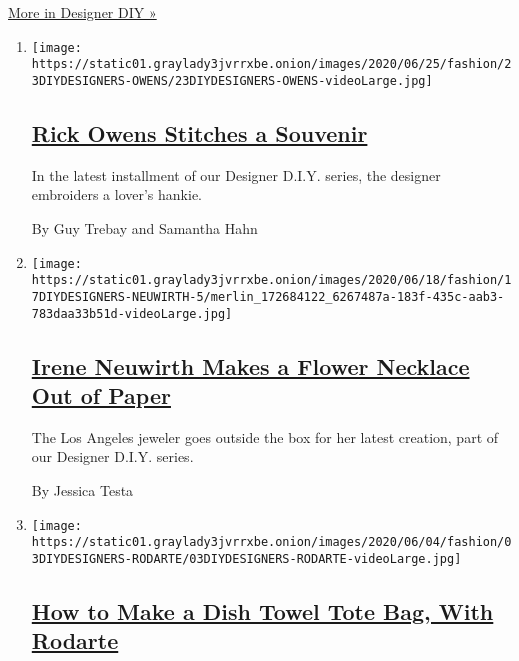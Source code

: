 \href{/issue/fashion/2020/06/19/designer-diy}{More in Designer DIY »}

\begin{enumerate}
\def\labelenumi{\arabic{enumi}.}
\item
  \texttt{[image: https://static01.graylady3jvrrxbe.onion/images/2020/06/25/fashion/23DIYDESIGNERS-OWENS/23DIYDESIGNERS-OWENS-videoLarge.jpg]}

  \hypertarget{rick-owens-stitches-a-souvenir}{%
  \subsection{\texorpdfstring{\href{/2020/06/23/style/DIY-sewing-rick-owens-stitches-a-souvenir.html}{Rick
  Owens Stitches a
  Souvenir}}{Rick Owens Stitches a Souvenir}}\label{rick-owens-stitches-a-souvenir}}

  In the latest installment of our Designer D.I.Y. series, the designer
  embroiders a lover's hankie.

  By Guy Trebay and Samantha Hahn
\item
  \texttt{[image: https://static01.graylady3jvrrxbe.onion/images/2020/06/18/fashion/17DIYDESIGNERS-NEUWIRTH-5/merlin\_172684122\_6267487a-183f-435c-aab3-783daa33b51d-videoLarge.jpg]}

  \hypertarget{irene-neuwirth-makes-a-flower-necklace-out-of-paper}{%
  \subsection{\texorpdfstring{\href{/2020/06/17/style/paper-flower-necklace-DIY.html}{Irene
  Neuwirth Makes a Flower Necklace Out of
  Paper}}{Irene Neuwirth Makes a Flower Necklace Out of Paper}}\label{irene-neuwirth-makes-a-flower-necklace-out-of-paper}}

  The Los Angeles jeweler goes outside the box for her latest creation,
  part of our Designer D.I.Y. series.

  By Jessica Testa
\item
  \texttt{[image: https://static01.graylady3jvrrxbe.onion/images/2020/06/04/fashion/03DIYDESIGNERS-RODARTE/03DIYDESIGNERS-RODARTE-videoLarge.jpg]}

  \hypertarget{how-to-make-a-dish-towel-tote-bag-with-rodarte}{%
  \subsection{\texorpdfstring{\href{/2020/06/02/style/dish-towel-tote-bag.html}{How
  to Make a Dish Towel Tote Bag, With
  Rodarte}}{How to Make a Dish Towel Tote Bag, With Rodarte}}\label{how-to-make-a-dish-towel-tote-bag-with-rodarte}}


\end{enumerate}
